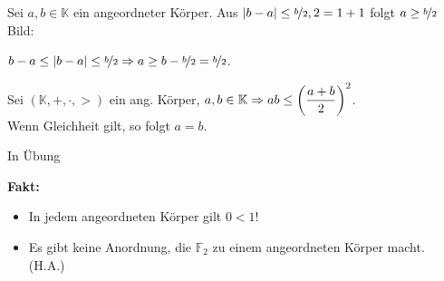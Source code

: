 \documentclass[../ana1.tex]{subfiles}
\begin{document}
\begin{bew}
\end{bew}
\begin{bsp}
	Sei $a,b\in{}$ ein angeordneter Körper. Aus $|b-a|\leq {}, 2 = 1+1$ folgt $a \geq {}$
	Bild: %
	\begin{bew}
		$b-a \leq |b-a| \leq {} \Rightarrow a \geq b -  = $.
	\end{bew}
\end{bsp}
\begin{kor}
	Sei $(,+,\cdot,>)$ ein ang. Körper, $a,b\in{}\\
		\Rightarrow ab \leq \left( \right)^2$.\\
	Wenn Gleichheit gilt, so folgt $a=b$.
\end{kor}
\begin{bew}
	In Übung
\end{bew}
\textbf{Fakt:}
\begin{itemize}
	\item In jedem angeordneten Körper gilt $0<1$!
	\item Es gibt keine Anordnung, die $_2$ zu einem angeordneten Körper macht. (H.A.)
\end{itemize}
\end{document}
